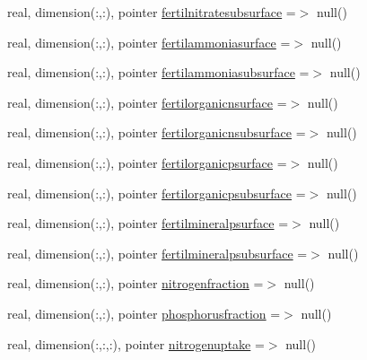 \begin{DoxyCompactItemize}
\item 
real, dimension(\+:,\+:), pointer \mbox{\hyperlink{structmoduleporousmediaproperties_1_1t__extvar_af4572d2251c4efbc5c8fae02e3511cd9}{fertilnitratesubsurface}} =$>$ null()
\item 
real, dimension(\+:,\+:), pointer \mbox{\hyperlink{structmoduleporousmediaproperties_1_1t__extvar_aa2a3e59703394cd0dd328d0ad3aafbde}{fertilammoniasurface}} =$>$ null()
\item 
real, dimension(\+:,\+:), pointer \mbox{\hyperlink{structmoduleporousmediaproperties_1_1t__extvar_a6bc146d07a3dbe1c60b690baf5c22693}{fertilammoniasubsurface}} =$>$ null()
\item 
real, dimension(\+:,\+:), pointer \mbox{\hyperlink{structmoduleporousmediaproperties_1_1t__extvar_a9749a45ee91abcf34b0c25866268a517}{fertilorganicnsurface}} =$>$ null()
\item 
real, dimension(\+:,\+:), pointer \mbox{\hyperlink{structmoduleporousmediaproperties_1_1t__extvar_a8607369ca2dbf074e90e1971999b395d}{fertilorganicnsubsurface}} =$>$ null()
\item 
real, dimension(\+:,\+:), pointer \mbox{\hyperlink{structmoduleporousmediaproperties_1_1t__extvar_a1e8a14391571e2758fcb470a5c0bba4c}{fertilorganicpsurface}} =$>$ null()
\item 
real, dimension(\+:,\+:), pointer \mbox{\hyperlink{structmoduleporousmediaproperties_1_1t__extvar_aa6c50dbefdb12a6f7d3ae6a069e3fded}{fertilorganicpsubsurface}} =$>$ null()
\item 
real, dimension(\+:,\+:), pointer \mbox{\hyperlink{structmoduleporousmediaproperties_1_1t__extvar_aebefc5794a957a9cc042aafa2b8f8181}{fertilmineralpsurface}} =$>$ null()
\item 
real, dimension(\+:,\+:), pointer \mbox{\hyperlink{structmoduleporousmediaproperties_1_1t__extvar_a37aad77c3a6406fbbeb37aa05bd12e40}{fertilmineralpsubsurface}} =$>$ null()
\item 
real, dimension(\+:,\+:), pointer \mbox{\hyperlink{structmoduleporousmediaproperties_1_1t__extvar_a224814c05f6940cfbfab18c4fa1d8300}{nitrogenfraction}} =$>$ null()
\item 
real, dimension(\+:,\+:), pointer \mbox{\hyperlink{structmoduleporousmediaproperties_1_1t__extvar_a0462146a40e3d330454f71f73962f196}{phosphorusfraction}} =$>$ null()
\item 
real, dimension(\+:,\+:,\+:), pointer \mbox{\hyperlink{structmoduleporousmediaproperties_1_1t__extvar_aee546e7da13679abf1c0d1abf187690e}{nitrogenuptake}} =$>$ null()
\item 

\end{DoxyCompactItemize}
